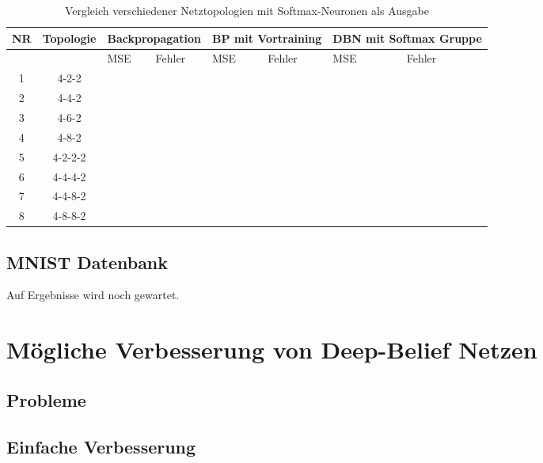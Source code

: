 \documentclass[12pt]{article}
\begin{document}
\begin{table}[H]
\begin{tabularx}{\textwidth}{|c|c|X|X|X|X|X|X|}
	\hline
	NR & Topologie & \multicolumn{2}{|c|}{Backpropagation} & \multicolumn{2}{|c|}{BP mit Vortraining} & \multicolumn{2}{|c|}{DBN mit Softmax Gruppe}\\\hline
	&&MSE& Fehler&MSE& Fehler&MSE& Fehler
	\\\hline
	1&4-2-2&&&&&&\\\hline
	2&4-4-2&&&&&&\\\hline
	3&4-6-2&&&&&&\\\hline
	4&4-8-2&&&&&&\\\hline
	5&4-2-2-2&&&&&&\\\hline
	6&4-4-4-2&&&&&&\\\hline
	7&4-4-8-2&&&&&&\\\hline
	8&4-8-8-2&&&&&&\\\hline
	\end{tabularx}
	\caption{Vergleich verschiedener Netztopologien mit Softmax-Neuronen als Ausgabe}
	\end{table}
	\subsection{MNIST Datenbank}
	
	Auf Ergebnisse wird noch gewartet.
	
	\section{Mögliche Verbesserung von Deep-Belief Netzen}
	\subsection{Probleme}

\subsection{Einfache Verbesserung}
\end{document}
